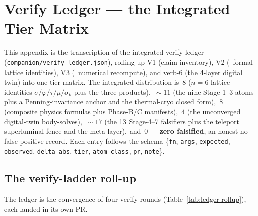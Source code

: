 \section{Verify Ledger --- the Integrated Tier Matrix}
\label{app:ledger}

This appendix is the transcription of the integrated verify ledger
(\texttt{companion/verify-ledger.json}), rolling up V1 (claim
inventory), V2 (\tierBlue\ formal lattice identities), V3 (\tierGreen\
numerical recompute), and verb-6 (the 4-layer digital twin) into one
tier matrix. The integrated distribution is \tierBlue$\,8$
($n\!=\!6$ lattice identities $\sigma/\varphi/\tau/\mu/\sigma_k$ plus the
three products), \tierGreen$\,\sim\!11$ (the nine Stage-1--3 atoms plus a
Penning-invariance anchor and the thermal-cryo closed form),
\tierYellow$\,8$ (composite physics formulas plus Phase-B/C manifests),
\tierOrange$\,4$ (the unconverged digital-twin body-solves),
\tierWhite$\,\sim\!17$ (the 13 Stage-4--7 falsifiers plus the teleport
superluminal fence and the meta layer), and \tierRed$\,0$ ---
\textbf{zero falsified}, an honest no-false-positive record. Each entry
follows the schema \{\texttt{fn}, \texttt{args}, \texttt{expected},
\texttt{observed}, \texttt{delta\_abs}, \texttt{tier},
\texttt{atom\_class}, \texttt{pr}, \texttt{note}\}.

\subsection{The verify-ladder roll-up}
\label{app:ledger-rollup}

The ledger is the convergence of four verify rounds
(Table~\ref{tab:ledger-rollup}), each landed in its own PR.

